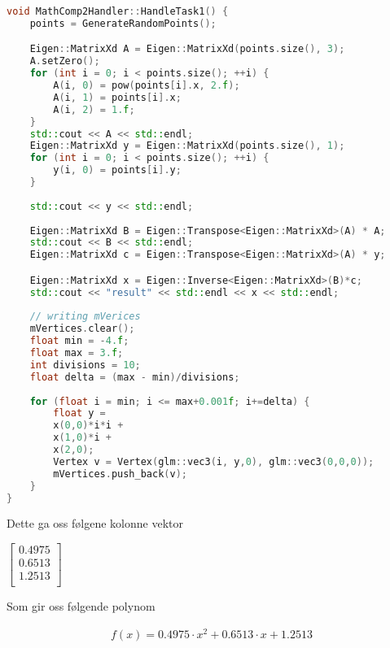 ﻿\documentclass[14]{article}
\begin{document}
\begin{flushleft}
        
        
        \begin{lstlisting}[language=C++, caption=Funksjon som genererer punktene]
void MathComp2Handler::HandleTask1() {
    points = GenerateRandomPoints();

    Eigen::MatrixXd A = Eigen::MatrixXd(points.size(), 3);
    A.setZero();
    for (int i = 0; i < points.size(); ++i) {
        A(i, 0) = pow(points[i].x, 2.f);
        A(i, 1) = points[i].x;
        A(i, 2) = 1.f;
    }
    std::cout << A << std::endl;
    Eigen::MatrixXd y = Eigen::MatrixXd(points.size(), 1);
    for (int i = 0; i < points.size(); ++i) {
        y(i, 0) = points[i].y;
    }
        
    std::cout << y << std::endl;
    
    Eigen::MatrixXd B = Eigen::Transpose<Eigen::MatrixXd>(A) * A;
    std::cout << B << std::endl;
    Eigen::MatrixXd c = Eigen::Transpose<Eigen::MatrixXd>(A) * y;

    Eigen::MatrixXd x = Eigen::Inverse<Eigen::MatrixXd>(B)*c;
    std::cout << "result" << std::endl << x << std::endl;
        
    // writing mVerices
    mVertices.clear();
    float min = -4.f;
    float max = 3.f;
    int divisions = 10;
    float delta = (max - min)/divisions;
        
    for (float i = min; i <= max+0.001f; i+=delta) {
        float y =
        x(0,0)*i*i +
        x(1,0)*i +
        x(2,0);
        Vertex v = Vertex(glm::vec3(i, y,0), glm::vec3(0,0,0));
        mVertices.push_back(v);    
    }
}
        \end{lstlisting}
        
        Dette ga oss følgene kolonne vektor
        \begin {center}
        $\begin{bmatrix}
            0.4975\\
            0.6513\\
            1.2513\\
        \end{bmatrix}$
        \end{center}
        
        Som gir oss følgende polynom
        
        \begin{align*}
            f(x) = 0.4975 \cdot  x^2 + 0.6513 \cdot x + 1.2513
        \end{align*}
        

\end{flushleft}
\end{document}
